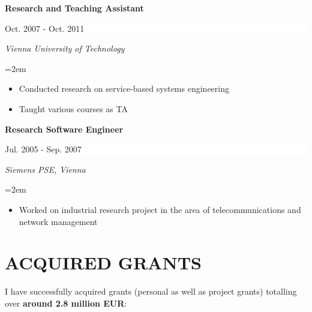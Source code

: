 \documentclass[paper=letter,fontsize=11pt]{scrartcl} %
\newcommand{\sepspace}{\vspace*{1em}}		%
\newcommand{\NewPart}[2]{\section*{\uppercase{#1} #2}}
\newcommand{\EducationEntry}[4]{
		\noindent \textbf{#1} \hfill      %
		\colorbox{White}{%
			\parbox{10em}{%
			\hfill\color{Black}#2}} \par  %
		\noindent \textit{#3} \par        %
		\noindent\hangindent=2em\hangafter=0 \small #4 %
		\normalsize \par}
\begin{document}
\sepspace
\EducationEntry{Research and Teaching Assistant}{Oct. 2007 - Oct. 2011}{Vienna
University of Technology} {\begin{itemize}\item{Conducted research on service-based systems engineering}
\item{Taught various courses as TA}
\end{itemize}}
\EducationEntry{Research Software Engineer}{Jul. 2005 - Sep. 2007}{Siemens PSE,
Vienna}{ {\begin{itemize}\item{Worked on industrial research project in the area of telecommunications and network management}
\end{itemize}}
}

\newpage

\NewPart{Acquired Grants}{}

I have successfully acquired grants (personal as well as project grants) totalling over \textbf{around 2.8 million EUR}:
\end{document}
